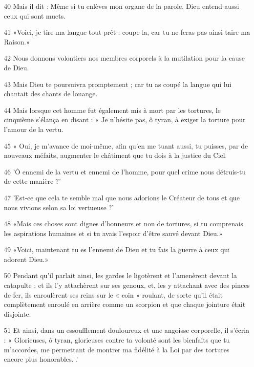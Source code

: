 \par 40 Mais il dit : Même si tu enlèves mon organe de la parole, Dieu entend aussi ceux qui sont muets.

\par 41 «Voici, je tire ma langue tout prêt : coupe-la, car tu ne feras pas ainsi taire ma Raison.»

\par 42 Nous donnons volontiers nos membres corporels à la mutilation pour la cause de Dieu.

\par 43 Mais Dieu te poursuivra promptement ; car tu as coupé la langue qui lui chantait des chants de louange.

\par 44 Mais lorsque cet homme fut également mis à mort par les tortures, le cinquième s'élança en disant : « Je n'hésite pas, ô tyran, à exiger la torture pour l'amour de la vertu.

\par 45 « Oui, je m'avance de moi-même, afin qu'en me tuant aussi, tu puisses, par de nouveaux méfaits, augmenter le châtiment que tu dois à la justice du Ciel.

\par 46 'Ô ennemi de la vertu et ennemi de l'homme, pour quel crime nous détruis-tu de cette manière ?'

\par 47 'Est-ce que cela te semble mal que nous adorions le Créateur de tous et que nous vivions selon sa loi vertueuse ?'

\par 48 «Mais ces choses sont dignes d'honneurs et non de tortures, si tu comprenais les aspirations humaines et si tu avais l'espoir d'être sauvé devant Dieu.»

\par 49 «Voici, maintenant tu es l'ennemi de Dieu et tu fais la guerre à ceux qui adorent Dieu.»

\par 50 Pendant qu'il parlait ainsi, les gardes le ligotèrent et l'amenèrent devant la catapulte ; et ils l'y attachèrent sur ses genoux, et, les y attachant avec des pinces de fer, ils enroulèrent ses reins sur le « coin » roulant, de sorte qu'il était complètement enroulé en arrière comme un scorpion et que chaque jointure était disjointe.

\par 51 Et ainsi, dans un essoufflement douloureux et une angoisse corporelle, il s'écria : « Glorieuses, ô tyran, glorieuses contre ta volonté sont les bienfaits que tu m'accordes, me permettant de montrer ma fidélité à la Loi par des tortures encore plus honorables. .'

